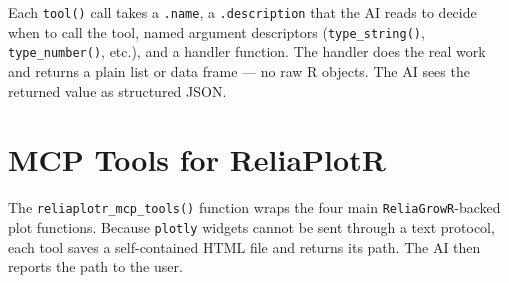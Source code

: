 \documentclass[
  letterpaper,
  DIV=11,
  numbers=noendperiod]{scrreprt}
\begin{document}
\begin{tcolorbox}[enhanced jigsaw, arc=.35mm, bottomrule=.15mm, bottomtitle=1mm, breakable, colback=white, colbacktitle=quarto-callout-note-color!10!white, colframe=quarto-callout-note-color-frame, coltitle=black, left=2mm, leftrule=.75mm, opacityback=0, opacitybacktitle=0.6, rightrule=.15mm, title=\textcolor{quarto-callout-note-color}{\faInfo}\hspace{0.5em}{What happens inside each tool}, titlerule=0mm, toprule=.15mm, toptitle=1mm]

Each \texttt{tool()} call takes a \texttt{.name}, a
\texttt{.description} that the AI reads to decide when to call the tool,
named argument descriptors (\texttt{type\_string()},
\texttt{type\_number()}, etc.), and a handler function. The handler does
the real work and returns a plain list or data frame --- no raw R
objects. The AI sees the returned value as structured JSON.

\end{tcolorbox}

\section{MCP Tools for ReliaPlotR}\label{mcp-tools-for-reliaplotr}

The \texttt{reliaplotr\_mcp\_tools()} function wraps the four main
\texttt{ReliaGrowR}-backed plot functions. Because \texttt{plotly}
widgets cannot be sent through a text protocol, each tool saves a
self-contained HTML file and returns its path. The AI then reports the
path to the user.
\end{document}
